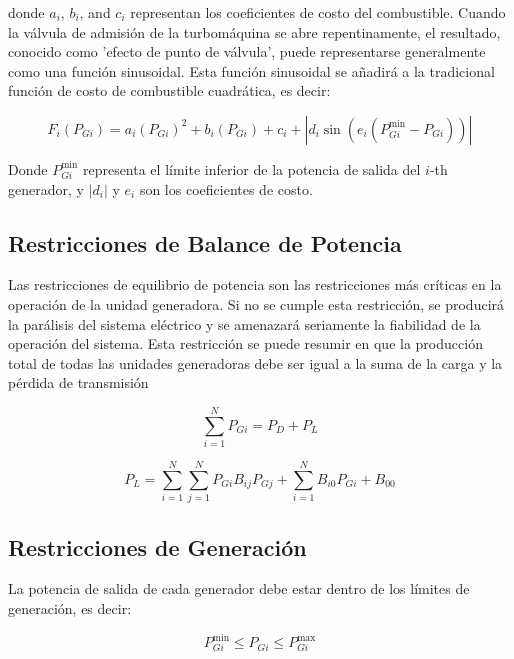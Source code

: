 \documentclass[11pt]{article}
\begin{document}
donde \( a_i \), \( b_i \), and \( c_i \) representan los coeficientes de costo del combustible. Cuando la válvula de 
admisión de la turbomáquina se abre repentinamente, el resultado, conocido como 'efecto de punto de válvula', 
puede representarse generalmente como una función sinusoidal. Esta función sinusoidal se añadirá a la tradicional 
función de costo de combustible cuadrática, es decir:

\begin{equation}
    F_i(P_{Gi}) = a_i(P_{Gi})^2 + b_i(P_{Gi}) + c_i + |d_i \sin(e_i (P_{Gi}^{\min} - P_{Gi}))|
\end{equation}

Donde \( P_{Gi}^{\min} \) representa el límite inferior de la potencia de salida del \( i \)-th generador, 
y \( |d_i| \) y \( e_i \) son los coeficientes de costo. 

\subsection{Restricciones de Balance de Potencia}
Las restricciones de equilibrio de potencia son las restricciones más críticas en la operación de la unidad generadora. 
Si no se cumple esta restricción, se producirá la parálisis del sistema eléctrico y se amenazará seriamente la fiabilidad
 de la operación del sistema. Esta restricción se puede resumir en que la producción total de todas las unidades generadoras 
 debe ser igual a la suma de la carga y la pérdida de transmisión

\begin{equation}
    \sum_{i=1}^{N} P_{Gi} = P_{D} + P_{L}
\end{equation}

\begin{equation}
    P_{L} = \sum_{i=1}^{N}\sum_{j=1}^{N} P_{Gi}B_{ij}P_{Gj} + \sum_{i=1}^{N}B_{i0}P_{Gi} + B_{00}
\end{equation}

\subsection{Restricciones de Generación}

La potencia de salida de cada generador debe estar dentro de los límites de generación, es decir:

\begin{equation}
    P_{Gi}^{\min} \leq P_{Gi} \leq P_{Gi}^{\max}
\end{equation}
\end{document}
